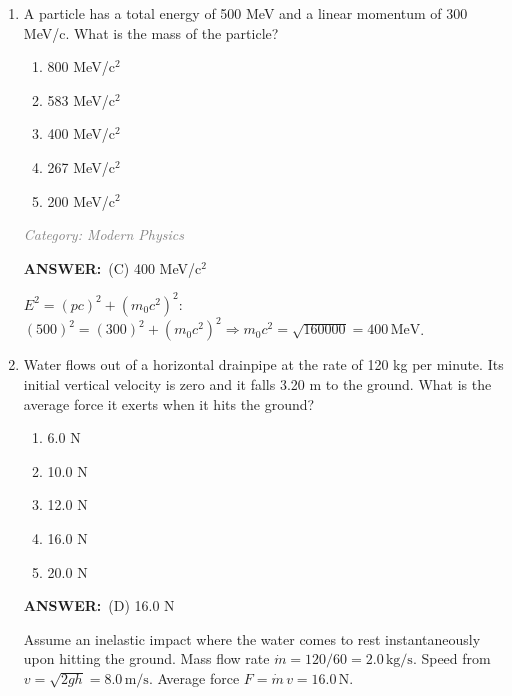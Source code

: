 ﻿\documentclass[12pt, a4paper]{article}
\makeatletter
\newcommand{\finalanswer}[1]{\textbf{ANSWER:}~#1}
\newif\if@categoryprinted
\newcommand{\category}[1]{\if@categoryprinted\relax\else\textit{\textcolor{gray}{Category: #1}}\global\@categoryprintedtrue\fi}
\makeatother
\begin{document}
\begin{CJK*}{UTF8}{gbsn}
\begin{enumerate}[itemsep=1.0em, topsep=0.6em]
\item \label{prob:32}
A particle has a total energy of 500 MeV and a linear momentum of 300 MeV/c. What is the mass of the particle?
\begin{enumerate}[label=(\Alph*)]
    \item 800 MeV/c$^2$
    \item 583 MeV/c$^2$
    \item 400 MeV/c$^2$
    \item 267 MeV/c$^2$
    \item 200 MeV/c$^2$
\end{enumerate}

\category{Modern Physics}
\begin{answerbox}
\finalanswer{(C) 400 MeV/c$^2$}
\end{answerbox}
\begin{solutionbox}

$E^2=(pc)^2+(m_0c^2)^2$: $(500)^2=(300)^2+(m_0c^2)^2 \Rightarrow m_0c^2=\sqrt{160000}=400\,\text{MeV}$.
\end{solutionbox}

\newpage

\item \label{prob:33}
Water flows out of a horizontal drainpipe at the rate of 120 kg per minute. Its initial vertical velocity is zero and it falls 3.20 m to the ground. What is the average force it exerts when it hits the ground?
\begin{enumerate}[label=(\Alph*)]
    \item 6.0 N
    \item 10.0 N
    \item 12.0 N
    \item 16.0 N
    \item 20.0 N
\end{enumerate}

\category{Momentum \& Impulse}
\begin{answerbox}
\finalanswer{(D) 16.0 N}
\end{answerbox}
\begin{solutionbox}

Assume an inelastic impact where the water comes to rest instantaneously upon hitting the ground. Mass flow rate $\dot m=120/60=2.0\,\text{kg/s}$. Speed from $v=\sqrt{2gh}=8.0\,\text{m/s}$. Average force $F=\dot m\,v=16.0\,\text{N}$.
\end{solutionbox}


\end{enumerate}
\end{CJK*}
\end{document}
